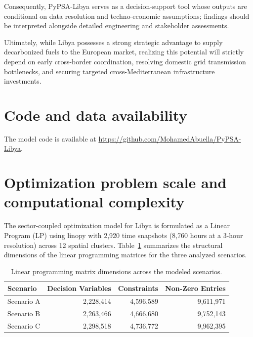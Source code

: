 \documentclass[preprint,12pt]{elsarticle}
\begin{document}
Consequently, \textsf{PyPSA-Libya} serves as a decision-support tool whose outputs are conditional on data resolution and techno-economic assumptions; findings should be interpreted alongside detailed engineering and stakeholder assessments.

Ultimately, while Libya possesses a strong strategic advantage to supply decarbonized fuels to the European market, realizing this potential will strictly depend on early cross-border coordination, resolving domestic grid transmission bottlenecks, and securing targeted cross-Mediterranean infrastructure investments.


\section*{Code and data availability}
The model code is available at \url{https://github.com/MohamedAbuella/PyPSA-Libya}.

\appendix
\section{Optimization problem scale and computational complexity}
\label{sec:appendix_problem_scale}

\setcounter{table}{0}
\renewcommand{\thetable}{A.\arabic{table}}
\setcounter{equation}{0}
\renewcommand{\theequation}{A.\arabic{equation}}
\setcounter{figure}{0}
\renewcommand{\thefigure}{A.\arabic{figure}}

The sector-coupled optimization model for Libya is formulated as a Linear Program (LP) using \textsf{linopy} with 2,920 time snapshots (8,760 hours at a 3-hour resolution) across 12 spatial clusters. Table~\ref{tab:problem_dimensions} summarizes the structural dimensions of the linear programming matrices for the three analyzed scenarios.

\begin{table}[htbp]
\centering
\caption{Linear programming matrix dimensions across the modeled scenarios.}
\label{tab:problem_dimensions}
\begin{tabular}{lrrr}
\toprule
{Scenario} & {Decision Variables} & {Constraints} & {Non-Zero Entries} \\ \midrule
Scenario A & 2,228,414 & 4,596,589 & 9,611,971 \\
Scenario B & 2,263,466 & 4,666,680 & 9,752,143 \\
Scenario C & 2,298,518 & 4,736,772 & 9,962,395 \\ \bottomrule
\end{tabular}
\end{table}
\end{document}
